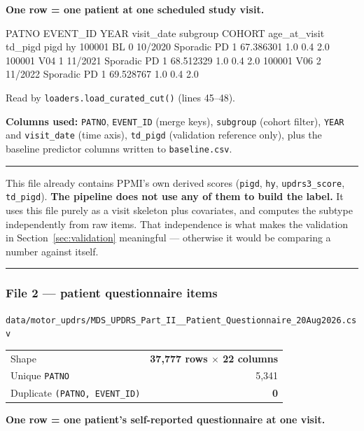 \documentclass[11pt,a4paper]{article}
\newcommand{\code}[1]{\texttt{\small #1}}
\newenvironment{keypoint}
  {\begin{center}\begin{minipage}{0.95\textwidth}%
   \vspace{4pt}\hrule\vspace{7pt}\small}
  {\vspace{7pt}\hrule\vspace{4pt}\end{minipage}\end{center}}
\begin{document}
\noindent
\textbf{One row = one patient at one scheduled study visit.}

\begin{codeblock}
 PATNO EVENT_ID  YEAR visit_date    subgroup  COHORT  age_at_visit  td_pigd  pigd   hy
100001       BL     0    10/2020 Sporadic PD       1     67.386301      1.0   0.4  2.0
100001      V04     1    11/2021 Sporadic PD       1     68.512329      1.0   0.4  2.0
100001      V06     2    11/2022 Sporadic PD       1     69.528767      1.0   0.4  2.0
\end{codeblock}

Read by \code{loaders.load\_curated\_cut()} (lines 45--48).

\textbf{Columns used:} \code{PATNO}, \code{EVENT\_ID} (merge keys),
\code{subgroup} (cohort filter), \code{YEAR} and \code{visit\_date} (time
axis), \code{td\_pigd} (validation reference only), plus the baseline predictor
columns written to \code{baseline.csv}.

\begin{keypoint}
This file already contains PPMI's own derived scores (\code{pigd}, \code{hy},
\code{updrs3\_score}, \code{td\_pigd}). \textbf{The pipeline does not use any of
them to build the label.} It uses this file purely as a visit skeleton plus
covariates, and computes the subtype independently from raw items. That
independence is what makes the validation in Section~\ref{sec:validation}
meaningful --- otherwise it would be comparing a number against itself.
\end{keypoint}

\subsubsection*{File 2 --- patient questionnaire items}

\code{data/motor\_updrs/MDS\_UPDRS\_Part\_II\_\_Patient\_Questionnaire\_20Aug2026.csv}

\begin{table}[h]
\centering
\begin{tabular}{@{}lr@{}}
\toprule
Shape & \textbf{37{,}777 rows $\times$ 22 columns} \\
Unique \code{PATNO} & 5{,}341 \\
Duplicate \code{(PATNO, EVENT\_ID)} & \textbf{0} \\
\bottomrule
\end{tabular}
\end{table}

\noindent
\textbf{One row = one patient's self-reported questionnaire at one visit.}
\end{document}
